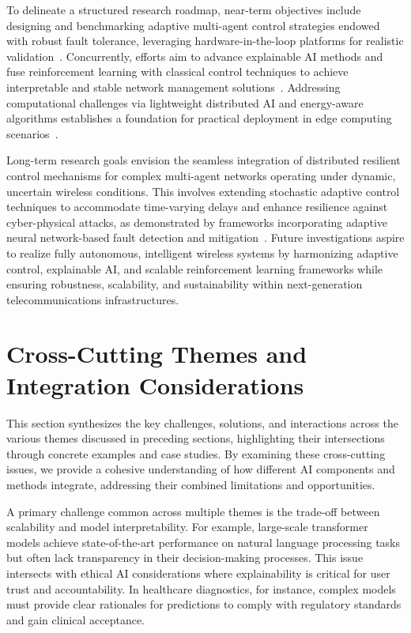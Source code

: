 \documentclass[sigconf]{acmart}
\begin{document}
To delineate a structured research roadmap, near-term objectives include designing and benchmarking adaptive multi-agent control strategies endowed with robust fault tolerance, leveraging hardware-in-the-loop platforms for realistic validation~\cite{ref46}. Concurrently, efforts aim to advance explainable AI methods and fuse reinforcement learning with classical control techniques to achieve interpretable and stable network management solutions~\cite{ref50}. Addressing computational challenges via lightweight distributed AI and energy-aware algorithms establishes a foundation for practical deployment in edge computing scenarios~\cite{ref49}.

Long-term research goals envision the seamless integration of distributed resilient control mechanisms for complex multi-agent networks operating under dynamic, uncertain wireless conditions. This involves extending stochastic adaptive control techniques to accommodate time-varying delays and enhance resilience against cyber-physical attacks, as demonstrated by frameworks incorporating adaptive neural network-based fault detection and mitigation~\cite{ref46}. Future investigations aspire to realize fully autonomous, intelligent wireless systems by harmonizing adaptive control, explainable AI, and scalable reinforcement learning frameworks while ensuring robustness, scalability, and sustainability within next-generation telecommunications infrastructures.

\section{Cross-Cutting Themes and Integration Considerations}

This section synthesizes the key challenges, solutions, and interactions across the various themes discussed in preceding sections, highlighting their intersections through concrete examples and case studies. By examining these cross-cutting issues, we provide a cohesive understanding of how different AI components and methods integrate, addressing their combined limitations and opportunities.

A primary challenge common across multiple themes is the trade-off between scalability and model interpretability. For example, large-scale transformer models achieve state-of-the-art performance on natural language processing tasks but often lack transparency in their decision-making processes. This issue intersects with ethical AI considerations where explainability is critical for user trust and accountability. In healthcare diagnostics, for instance, complex models must provide clear rationales for predictions to comply with regulatory standards and gain clinical acceptance.
\end{document}
